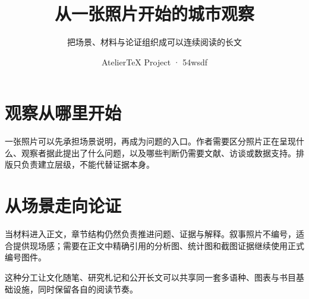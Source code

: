 \documentclass[profile=essay,titlelayout=essay]{atelier}
\title{从一张照片开始的城市观察}
\subtitle{把场景、材料与论证组织成可以连续阅读的长文}
\author{AtelierTeX Project · 54wsdf}
\begin{document}
\maketitle

\section{观察从哪里开始}

一张照片可以先承担场景说明，再成为问题的入口。作者需要区分照片正在呈现什么、观察者据此提出了什么问题，以及哪些判断仍需要文献、访谈或数据支持。排版只负责建立层级，不能代替证据本身。


\section{从场景走向论证}

当材料进入正文，章节结构仍然负责推进问题、证据与解释。叙事照片不编号，适合提供现场感；需要在正文中精确引用的分析图、统计图和截图证据继续使用正式编号图件。

这种分工让文化随笔、研究札记和公开长文可以共享同一套多语种、图表与书目基础设施，同时保留各自的阅读节奏。
\end{document}
